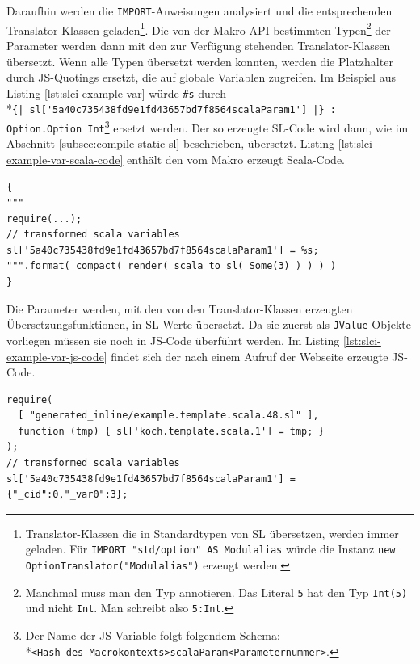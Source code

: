 \documentclass[12pt,bibtotoc]{scrreprt}
\begin{document}
Daraufhin werden die \lstinline!IMPORT!-Anweisungen analysiert und die entsprechenden Translator-Klassen geladen\footnote{Translator-Klassen die in Standardtypen von SL übersetzen, werden immer geladen. Für \lstinline!IMPORT "std/option" AS Modulalias! würde die Instanz \lstinline!new OptionTranslator("Modulalias")! erzeugt werden.}.  Die von der Makro-API bestimmten Typen\footnote{Manchmal muss man den Typ annotieren. Das Literal \lstinline!5! hat den Typ \lstinline!Int(5)! und nicht \lstinline!Int!. Man schreibt also \lstinline!5:Int!.} der Parameter werden dann mit den zur Verfügung stehenden Translator-Klassen übersetzt.
Wenn alle Typen übersetzt werden konnten, werden die Platzhalter durch \ac{JS}-Quotings ersetzt, die auf globale Variablen zugreifen. Im Beispiel aus Listing \ref{lst:slci-example-var} würde \lstinline!#s! durch \\*\lstinline!{| sl['5a40c735438fd9e1fd43657bd7f8564scalaParam1'] |} : Option.Option Int!\footnote{Der Name der JS-Variable folgt folgendem Schema: \\*\lstinline!<Hash des Macrokontexts>scalaParam<Parameternummer>!.} ersetzt werden. Der so erzeugte SL-Code wird dann, wie im Abschnitt \ref{subsec:compile-static-sl} beschrieben, übersetzt. 
Listing \ref{lst:slci-example-var-scala-code} enthält den vom Makro erzeugt Scala-Code. 

\begin{lstlisting}[caption={Erzeugter Scala-Code zum Listing \ref{lst:slci-example-var}}, label=lst:slci-example-var-scala-code, float=h]
{ 
"""
require(...);
// transformed scala variables    
sl['5a40c735438fd9e1fd43657bd7f8564scalaParam1'] = %s;
""".format( compact( render( scala_to_sl( Some(3) ) ) ) )
}
\end{lstlisting}

Die Parameter werden, mit den von den Translator-Klassen erzeugten Übersetzungsfunktionen, in \ac{SL}-Werte übersetzt. Da sie zuerst als \lstinline!JValue!-Objekte vorliegen müssen sie noch in \ac{JS}-Code überführt werden. Im Listing \ref{lst:slci-example-var-js-code} findet sich der nach einem Aufruf der Webseite erzeugte \ac{JS}-Code.

\begin{lstlisting}[caption={JS-Code zum Listing \ref{lst:slci-example-var}}, label=lst:slci-example-var-js-code, float=h]
require( 
  [ "generated_inline/example.template.scala.48.sl" ],
  function (tmp) { sl['koch.template.scala.1'] = tmp; }
);
// transformed scala variables 
sl['5a40c735438fd9e1fd43657bd7f8564scalaParam1'] = {"_cid":0,"_var0":3};
\end{lstlisting}
\end{document}
